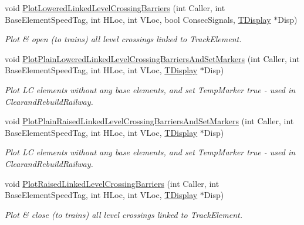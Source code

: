 \begin{DoxyCompactItemize}
\mbox{\label{class_t_track_aa0e977764887fba8aa0dab82ef0b957b}} 
void \mbox{\hyperlink{class_t_track_aa0e977764887fba8aa0dab82ef0b957b}{Plot\+Lowered\+Linked\+Level\+Crossing\+Barriers}} (int Caller, int Base\+Element\+Speed\+Tag, int H\+Loc, int V\+Loc, bool Consec\+Signals, \mbox{\hyperlink{class_t_display}{T\+Display}} $\ast$Disp)
\begin{DoxyCompactList}\small\item\em Plot \& open (to trains) all level crossings linked to Track\+Element. \end{DoxyCompactList}\item 
\mbox{\label{class_t_track_a85837fb5110486604fab79d42ec60db6}} 
void \mbox{\hyperlink{class_t_track_a85837fb5110486604fab79d42ec60db6}{Plot\+Plain\+Lowered\+Linked\+Level\+Crossing\+Barriers\+And\+Set\+Markers}} (int Caller, int Base\+Element\+Speed\+Tag, int H\+Loc, int V\+Loc, \mbox{\hyperlink{class_t_display}{T\+Display}} $\ast$Disp)
\begin{DoxyCompactList}\small\item\em Plot LC elements without any base elements, and set Temp\+Marker true -\/ used in Clearand\+Rebuild\+Railway. \end{DoxyCompactList}\item 
\mbox{\label{class_t_track_a1f59015a92ef00604156a44011b4f4c8}} 
void \mbox{\hyperlink{class_t_track_a1f59015a92ef00604156a44011b4f4c8}{Plot\+Plain\+Raised\+Linked\+Level\+Crossing\+Barriers\+And\+Set\+Markers}} (int Caller, int Base\+Element\+Speed\+Tag, int H\+Loc, int V\+Loc, \mbox{\hyperlink{class_t_display}{T\+Display}} $\ast$Disp)
\begin{DoxyCompactList}\small\item\em Plot LC elements without any base elements, and set Temp\+Marker true -\/ used in Clearand\+Rebuild\+Railway. \end{DoxyCompactList}\item 
\mbox{\label{class_t_track_adbaf9ab8b709af9d194603892ac91133}} 
void \mbox{\hyperlink{class_t_track_adbaf9ab8b709af9d194603892ac91133}{Plot\+Raised\+Linked\+Level\+Crossing\+Barriers}} (int Caller, int Base\+Element\+Speed\+Tag, int H\+Loc, int V\+Loc, \mbox{\hyperlink{class_t_display}{T\+Display}} $\ast$Disp)
\begin{DoxyCompactList}\small\item\em Plot \& close (to trains) all level crossings linked to Track\+Element. \end{DoxyCompactList}\item 

\end{DoxyCompactItemize}
